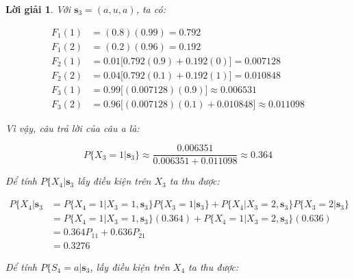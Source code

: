 \documentclass[14pt, a4paper]{article}
\numberwithin{equation}{section}
\numberwithin{figure}{section}
\theoremstyle{sltheorem}
\theoremstyle{soltheorem}
\newtheorem*{loigiai}{Lời giải}
\numberwithin{dl}{section}
\numberwithin{md}{section}
\numberwithin{vd}{section}
\begin{document}
    \begin{loigiai}
        Với $\mathbf{s}_3=(a, u, a)$, ta có:

        \begin{equation*}
            \begin{aligned}
                F_1(1) &= (0.8)(0.99) = 0.792 \\
                F_1(2) &= (0.2)(0.96) = 0.192 \\
                F_2(1) &= 0.01\lbrack 0.792(0.9) + 0.192(0) \rbrack = 0.007128 \\
                F_2(2) &= 0.04 \lbrack 0.792(0.1) + 0.192(1) \rbrack = 0.010848 \\
                F_3(1) &= 0.99 \lbrack (0.007128)(0.9) \rbrack \approx 0.006531 \\
                F_3(2) &= 0.96 \lbrack (0.007128)(0.1) + 0.010848 \rbrack \approx 0.011098
            \end{aligned}
        \end{equation*}

        Vì vậy, câu trả lời của câu a là:

        \begin{equation*}
            P \lbrace X_3 = 1 \vert \mathbf{s}_3 \rbrace \approx \dfrac{0.006351}{0.006351 + 0.011098} \approx 0.364
        \end{equation*}

        Để tính $P \lbrace X_4 \vert \mathbf{s}_3$ lấy điều kiện trên $X_3$ ta thu được:

        \begin{equation*}
            \begin{aligned}
                P \lbrace X_4 \vert \mathbf{s}_3 &= P \lbrace X_4 = 1 \vert X_3 = 1, \mathbf{s}_3 \rbrace P \lbrace X_3 = 1 \vert \mathbf{s}_3 \rbrace + P \lbrace X_4 \vert X_3 = 2, \mathbf{s}_3 \rbrace P \lbrace X_3 = 2 \vert \mathbf{s}_3 \rbrace \\
                &= P \lbrace X_4 = 1 \vert X_3 = 1, \mathbf{s}_3 \rbrace (0.364) + P \lbrace X_4=1 \vert X_3 = 2, \mathbf{s}_3 \rbrace (0.636) \\
                &= 0.364 P_{11} + 0.636 P_{21} \\
                &= 0.3276
            \end{aligned}
        \end{equation*}

        Để tính $P \lbrace S_4 = a \vert \mathbf{s}_3$, lấy điều kiện trên $X_4$ ta thu được:


\end{loigiai}
\end{document}

